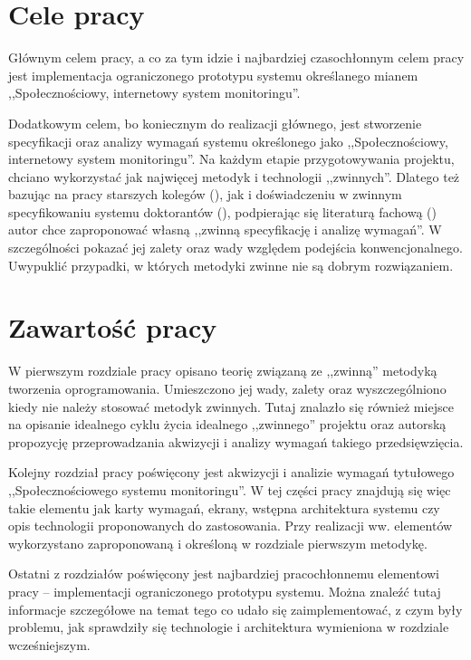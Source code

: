 \newpage

\section{Cele pracy}
\label{sec:celePracy}

Głównym celem pracy, a co za tym idzie i najbardziej czasochłonnym celem pracy jest implementacja ograniczonego prototypu systemu określanego mianem ,,Społecznościowy, internetowy system monitoringu''.

Dodatkowym celem, bo koniecznym do realizacji głównego, jest stworzenie specyfikacji oraz analizy wymagań systemu określonego jako ,,Społecznościowy, internetowy system monitoringu''. Na każdym etapie przygotowywania projektu, chciano wykorzystać jak najwięcej metodyk i technologii ,,zwinnych''. Dlatego też bazując na pracy starszych kolegów (\cite{JakMich06}), jak i doświadczeniu w zwinnym specyfikowaniu systemu doktorantów (\cite{Mad09}), podpierając się literaturą fachową (\cite{Bec99}) autor chce zaproponować własną ,,zwinną specyfikację i analizę wymagań''. W szczególności pokazać jej zalety oraz wady względem podejścia konwencjonalnego. Uwypuklić przypadki, w których metodyki zwinne nie są dobrym rozwiązaniem.

\section{Zawartość pracy}
\label{sec:zawartoscPracy}

W pierwszym rozdziale pracy opisano teorię związaną ze ,,zwinną'' metodyką tworzenia oprogramowania. Umieszczono jej wady, zalety oraz wyszczególniono kiedy nie należy stosować metodyk zwinnych. Tutaj znalazło się również miejsce na opisanie idealnego cyklu życia idealnego ,,zwinnego'' projektu oraz autorską propozycję przeprowadzania akwizycji i analizy wymagań takiego przedsięwzięcia.

Kolejny rozdział pracy poświęcony jest akwizycji i analizie wymagań tytułowego ,,Społecznościowego systemu monitoringu''. W tej części pracy znajdują się więc takie elementu jak karty wymagań, ekrany, wstępna architektura systemu czy opis technologii proponowanych do zastosowania. Przy realizacji ww. elementów wykorzystano zaproponowaną i określoną w rozdziale pierwszym metodykę.

Ostatni z rozdziałów poświęcony jest najbardziej pracochłonnemu elementowi pracy -- implementacji ograniczonego prototypu systemu. Można znaleźć tutaj informacje szczegółowe na temat tego co udało się zaimplementować, z czym były problemu, jak sprawdziły się technologie i architektura wymieniona w rozdziale wcześniejszym.

